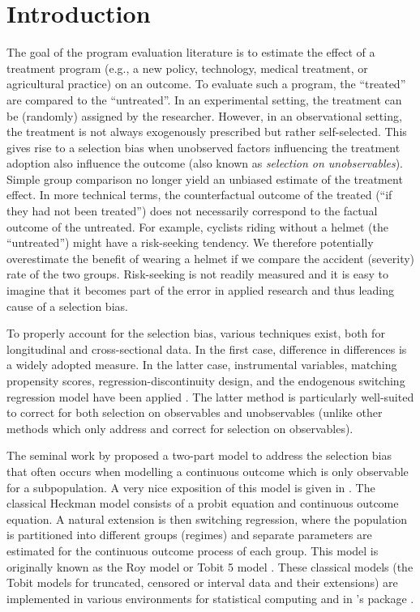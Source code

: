 \documentclass[%
    twoside, openright, titlepage, numbers=noenddot,%
    cleardoublepage=empty,%
    abstract=false,%
    BCOR=5.5mm, paper=a5, fontsize=10pt,%
]{scrreprt}
\begin{document}
\section{Introduction} \label{sec:intro}

The goal of the program evaluation literature is to estimate the effect of a treatment program (e.g., a new policy, technology, medical treatment, or agricultural practice) on an outcome. To evaluate such a program, the ``treated'' are compared to the ``untreated''. In an experimental setting, the treatment can be (randomly) assigned by the researcher. However, in an observational setting, the treatment is not always exogenously prescribed but rather self-selected. This gives rise to a selection bias when unobserved factors influencing the treatment adoption also influence the outcome (also known as \emph{selection on unobservables}). Simple group comparison no longer yield an unbiased estimate of the treatment effect. In more technical terms, the counterfactual outcome of the treated (``if they had not been treated'') does not necessarily correspond to the factual outcome of the untreated. For example, cyclists riding without a helmet (the ``untreated'') might have a risk-seeking tendency. We therefore potentially overestimate the benefit of wearing a helmet if we compare the accident (severity) rate of the two groups. Risk-seeking is not readily measured and it is easy to imagine that it becomes part of the error in applied research and thus leading cause of a selection bias.

To properly account for the selection bias, various techniques exist, both for longitudinal and cross-sectional data. In the first case, difference in differences is a widely adopted measure. In the latter case, instrumental variables, matching propensity scores, regression-discontinuity design, and the endogenous switching regression model have been applied \citep{Wang+Mokhtarian:2024}. The latter method is particularly well-suited to correct for both selection on observables and unobservables (unlike other methods which only address and correct for selection on observables).

The seminal work by \cite{Heckman:1979} proposed a two-part model to address the selection bias that often occurs when modelling a continuous outcome which is only observable for a subpopulation. A very nice exposition of this model is given in \citet[][Chapter~16]{Cameron+Trivedi:2005}. The classical Heckman model consists of a probit equation and continuous outcome equation. A natural extension is then switching regression, where the population is partitioned into different groups (regimes) and separate parameters are estimated for the continuous outcome process of each group. This model is originally known as the Roy model \citep{Cameron+Trivedi:2005} or Tobit 5 model \citep{Amemiya:1985}. These classical models (the Tobit models for truncated, censored or interval data and their extensions) are implemented in various environments for statistical computing and in 's \citep{R}  package \citep{Toomet+Henningsen:2008}.
\end{document}
